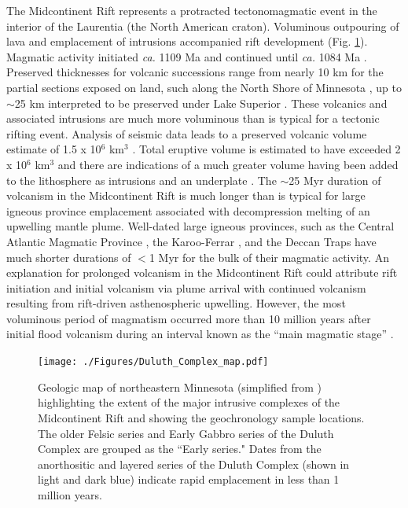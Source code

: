 \documentclass[11pt,letterpaper]{article}
\begin{document}
The Midcontinent Rift represents a protracted tectonomagmatic event in the interior of the Laurentia (the North American craton). Voluminous outpouring of lava and emplacement of intrusions accompanied rift development (Fig. \ref{fig:map}). Magmatic activity initiated \textit{ca.} 1109 Ma and continued until \textit{ca.} 1084 Ma \citep{Swanson-Hysell2019a}. Preserved thicknesses for volcanic successions range from nearly 10 km for the partial sections exposed on land, such along the North Shore of Minnesota \citep{Green2011a}, up to $\sim$25 km interpreted to be preserved under Lake Superior \citep{Cannon1992b}. These volcanics and associated intrusions are much more voluminous than is typical for a tectonic rifting event. Analysis of seismic data leads to a preserved volcanic volume estimate of 1.5 x 10$^6$ km$^3$ \citep{Cannon1992b}. Total eruptive volume is estimated to have exceeded 2 x 10$^6$ km$^3$ and there are indications of a much greater volume having been added to the lithosphere as intrusions and an underplate \citep{Cannon1992b}. The $\sim$25 Myr duration of volcanism in the Midcontinent Rift is much longer than is typical for large igneous province emplacement associated with decompression melting of an upwelling mantle plume. Well-dated large igneous provinces, such as the Central Atlantic Magmatic Province \citep{Blackburn2013a}, the Karoo-Ferrar \citep{Burgess2015a}, and the Deccan Traps \citep{Schoene2019a, Sprain2019a} have much shorter durations of $<$1 Myr for the bulk of their magmatic activity. An explanation for prolonged volcanism in the Midcontinent Rift could attribute rift initiation and initial volcanism via plume arrival with continued volcanism resulting from rift-driven asthenospheric upwelling. However, the most voluminous period of magmatism occurred more than 10 million years after initial flood volcanism during an interval known as the ``main magmatic stage'' \citep{Vervoort2007a}. 

\begin{figure}
\centering
\noindent\texttt{[image: ./Figures/Duluth\_Complex\_map.pdf]}
\caption{\small{Geologic map of northeastern Minnesota (simplified from \citealp{Jirsa2011a}) highlighting the extent of the major intrusive complexes of the Midcontinent Rift and showing the geochronology sample locations. The older Felsic series and Early Gabbro series of the Duluth Complex are grouped as the ``Early series." Dates from the anorthositic and layered series of the Duluth Complex (shown in light and dark blue) indicate rapid emplacement in less than 1 million years.}}
\label{fig:map}
\end{figure} 
\end{document}
